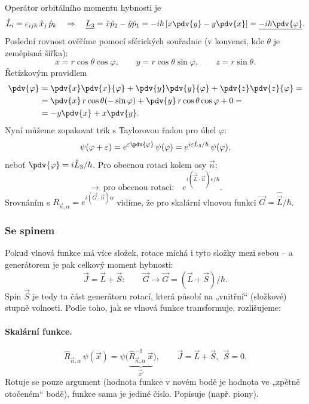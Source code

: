 Operátor orbitálního momentu hybnosti je
\[
  \hat L_i = \varepsilon_{ijk}\,\hat x_j\,\hat p_k
  \quad\Rightarrow\quad
  \underline{L_3} = \hat x\hat p_2 - \hat y\hat p_1
  = -i\hbar\left[x\pdv{y} - y\pdv{x}\right]
  = \underline{-i\hbar\pdv{\varphi}} .
\]
Poslední rovnost ověříme pomocí sférických souřadnic (v konvenci, kde
\(\theta\) je zeměpisná šířka):
\[
  x = r\cos\theta\cos\varphi, \qquad
  y = r\cos\theta\sin\varphi, \qquad
  z = r\sin\theta .
\]
Řetízkovým pravidlem
\begin{align*}
  \pdv{\varphi} &= \pdv{x}\pdv{x}{\varphi} + \pdv{y}\pdv{y}{\varphi}
                 + \pdv{z}\pdv{z}{\varphi} = \\
  &= \pdv{x}\,r\cos\theta(-\sin\varphi) + \pdv{y}\,r\cos\theta\cos\varphi + 0 = \\
  &= -y\pdv{x} + x\pdv{y} .
\end{align*}
Nyní můžeme zopakovat trik s Taylorovou řadou pro úhel \(\varphi\):
\[
  \psi(\varphi+\varepsilon) = e^{\varepsilon\pdv{\varphi}}\,\psi(\varphi)
  = e^{i\varepsilon\hat L_3/\hbar}\,\psi(\varphi),
\]
neboť \(\pdv{\varphi} = i\hat L_3/\hbar\). Pro obecnou rotaci kolem osy
\(\vec n\):
\[
  \to\ \text{pro obecnou rotaci:}\quad e^{i(\hat{\vec L}\cdot\vec n)\varepsilon/\hbar} .
\]
Srovnáním s \(R_{\vec n,\alpha} = e^{i(\vec G\cdot\vec n)\alpha}\) vidíme, že
pro skalární vlnovou funkci \(\vec G = \hat{\vec L}/\hbar\).

\subsubsection{Se spinem}
Pokud vlnová funkce má více složek, rotace míchá i tyto složky mezi sebou
– a generátorem je pak celkový moment hybnosti:
\[
  \vec J = \vec L + \vec S : \qquad \vec G \to \vec G = (\vec L + \vec S)/\hbar .
\]
Spin \(\vec S\) je tedy ta část generátoru rotací, která působí na
„vnitřní`` (složkové) stupně volnosti. Podle toho, jak se vlnová funkce
transformuje, rozlišujeme:

\paragraph{Skalární funkce.}
\[
  \hat R_{\vec n,\alpha}\,\psi(\vec x) = \psi\big(\underbrace{\hat R^{-1}_{\vec n,\alpha}\,\vec x}_{\vec x'}\big),
  \qquad \vec J = \vec L + \vec S,\ \ \vec S = 0 .
\]
Rotuje se pouze argument (hodnota funkce v novém bodě je hodnota ve
„zpětně otočeném`` bodě), funkce sama je jediné číslo. Popisuje
 (např. piony).

